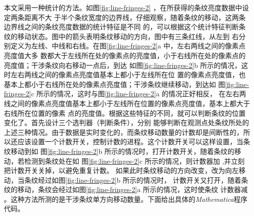 \documentclass[UTF8,a4paper,12pt]{article}
\begin{document}
本文采用一种统计的方法。如图\;\ref{fig:line-fringes-2} ，在所获得的条纹亮度数据中设定两条距离不大
于半个条纹宽度的边界线，仔细观察，随着条纹的移动，这两条边界线之间的条纹亮度数据的统计特征是不同
的，可以根据这个统计特征判断条纹的移动状态。图中的箭头表明条纹移动的方向，图中有三条红线，从左到
右分别定义为左线、中线和右线。在图\;\ref{fig:line-fringes-2}a 中，左右两线之间的像素点亮度值大多
数都大于左线所在处的像素点的亮度值，小于右线所在处的像素点的亮度值；干涉条纹向右移动一点后，到达
如图\;\ref{fig:line-fringes-2}b 所示的情况，这时左右两线之间的像素点亮度值基本上都小于左线所在位
置的像素点亮度值，也基本上都小于右线所在处的像素点亮度值；干涉条纹继续移动，到达如
图\;\ref{fig:line-fringes-2}c 所示的情况，这时与图\;\ref{fig:line-fringes-2}a 的情况正好相反，
在左右两线之间的像素点亮度值基本上都小于左线所在位置的像素点亮度值，基本上都大于右线所在位置的像素
点的亮度值。根据这些特征的不同，就可以判断条纹的位置变化了。首先设计三个选判器（判断条件），分别
能够判断在观测点处条纹所处的上述三种情况。由于数据是实时变化的，而条纹移动数量的计数却是间断性的，所
以还应该设置一个计数开关，控制计数的进程。这个计数开关可以这样设置，当条纹移动到如
图\;\ref{fig:line-fringes-2}b 所示的情况时，打开计数开关，随着条纹的移动，若检测到条纹处在如
图\;\ref{fig:line-fringes-2}c 所示的情况，则计数器加 ,并立刻把计数开关关掉，以避免重复计数。
如果此时条纹移动的方向改变，改为向左移动，当条纹经过如图\;\ref{fig:line-fringes-2}b 所示的情况时，
计数开关又打开，随着条纹的移动，条纹会经过如图\;\ref{fig:line-fringes-2}a 所示的情况，这时使条纹
计数器减 。这种方法所测的是干涉条纹单方向移动数量。下面给出具体的\textit{Mathematica}程序代码。
\end{document}
